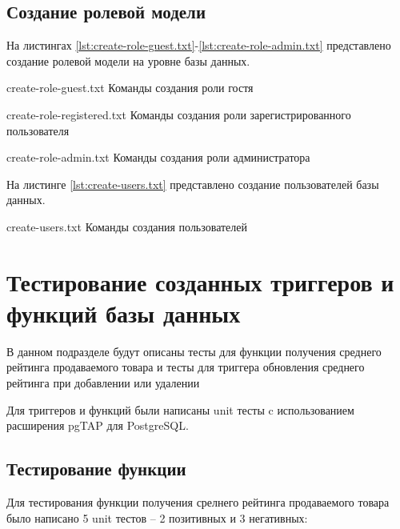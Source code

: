 \clearpage

\subsection{Создание ролевой модели}

На листингах \ref{lst:create-role-guest.txt}-\ref{lst:create-role-admin.txt} представлено создание ролевой модели на уровне базы данных.

{create-role-guest.txt} %
{Команды создания роли гостя} %

{create-role-registered.txt} %
{Команды создания роли зарегистрированного пользователя} %

{create-role-admin.txt} %
{Команды создания роли администратора} %

На листинге \ref{lst:create-users.txt} представлено создание пользователей базы данных.

{create-users.txt} %
{Команды создания пользователей} %

\clearpage

\section{Тестирование созданных триггеров и функций базы данных}

В данном подразделе будут описаны тесты для функции получения среднего рейтинга продаваемого товара и тесты для триггера обновления среднего рейтинга при добавлении или удалении 

Для триггеров и функций были написаны unit тесты \cite{info_unit_tests} c использованием расширения pgTAP \cite{info_pgTAB} для PostgreSQL.

\subsection{Тестирование функции}

Для тестирования функции получения срелнего рейтинга продаваемого товара было написано 5 unit тестов -- 2 позитивных и 3 негативных:

